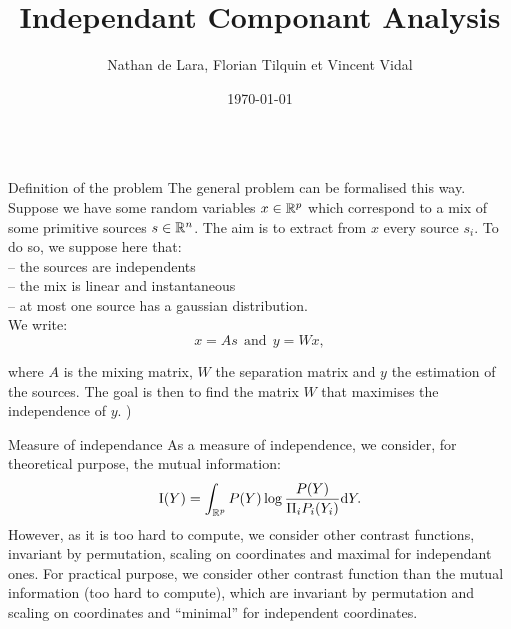 \documentclass{beamer}
\title[ICA]{Independant Componant Analysis}
\author[Lara, Tilquin, Vidal]{Nathan de Lara, Florian Tilquin et Vincent Vidal}
\institute[Université Paris-Saclay]{Master Mathématiques, Vision et Apprentissage, ENS Cachan}
\date{\today}
\newcommand{\zZ}[2]{\mathrm #1\!\zp{#2}}
\begin{document}
\begin{frame}{}
	\vfill
\begin{columns}[T]
\begin{column}{.48\linewidth}
\begin{block}{Definition of the problem}
The general problem can be formalised this way.
Suppose we have some random variables $x\in\mathbb{R}^p$ which correspond to
a mix of some primitive sources $s\in\mathbb{R}^n$. The aim is to extract
from $x$ every source $s_i$. To do so, we suppose here that:\\
-- the sources are independents\\
-- the mix is linear and instantaneous\\
-- at most one source has a gaussian distribution.\\
We write:
\begin{equation}
 x = A s \ \ \mbox{and} \ \ y = W x,
\end{equation}

where $A$ is the mixing matrix, $W$ the separation matrix and $y$ the
estimation of the sources. The goal is then to find the matrix $W$ that
maximises the independence of $y$.
	 )
\end{block}
\begin{block}{Measure of independance}
As a measure of independence, we consider, for theoretical purpose,
the mutual information:\begin{equation}
\zZ IY = \int_{\zR^p} P(Y) \log\frac{P(Y)}{\Pi_i P_i(Y_i)} \zdx Y.
\end{equation}
However, as it is too hard to compute, we consider other contrast functions, invariant by permutation, scaling on coordinates and maximal for independant ones.
For practical purpose, we consider other contrast function than the
mutual information (too hard to compute), which are invariant by permutation
and scaling on coordinates and ``minimal'' for independent coordinates.
\end{block}
\end{column}


\end{columns}
\end{frame}
\end{document}
